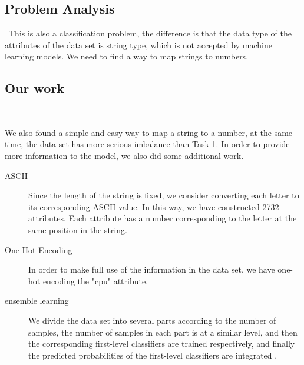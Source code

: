 \subsection{Problem Analysis}
\
This is also a classification problem, the difference is that the data type of the attributes of the data set is string type, which is not accepted by machine learning models. We need to find a way to map strings to numbers.

\subsection{Our work}
\

We also found a simple and easy way to map a string to a number, at the same time, the data set has more serious imbalance than Task 1. In order to provide more information to the model, we also did some additional work.


\begin{description}
	\item[ASCII] Since the length of the string is fixed, we consider converting each letter to its corresponding ASCII value. In this way, we have constructed 2732 attributes. Each attribute has a number corresponding to the letter at the same position in the string.
	\item[One-Hot Encoding] In order to make full use of the information in the data set, we have one-hot encoding the "cpu" attribute.
	\item[ensemble learning] We divide the data set into several parts according to the number of samples, the number of samples in each part is at a similar level, and then the corresponding first-level classifiers are trained respectively, and finally the predicted probabilities of the first-level classifiers are integrated .
\end{description}











